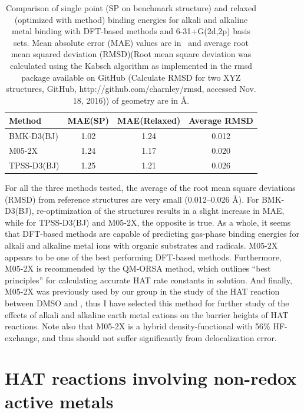 \begin{doublespace}
\begin{table}
  \caption[Comparison of single point and relaxed binding energies for alkali
  and alkaline metal binding with DFT-based methods.]{Comparison of single point
  (SP on benchmark structure) and relaxed (optimized with method) binding
  energies for alkali and alkaline metal binding with DFT-based methods and
  6-31+G(2d,2p) basis sets. Mean absolute error (MAE) values are in \kcalmol\
  and average root mean squared deviation (RMSD)(Root mean square deviation was
  calculated using the Kabsch algorithm\protect\cite{Kabsch1976} as implemented
  in the rmsd package available on GitHub (Calculate RMSD for two XYZ
  structures, GitHub, http://github.com/charnley/rmsd, accessed Nov. 18, 2016))
  of geometry are in \AA.}
  \label{tab:ccsd-metal-opt}
  \begin{tabular}{l c c c}
    Method & MAE(SP) & MAE(Relaxed) & Average RMSD \\
    \hline
    BMK-D3(BJ) & 1.02 & 1.24 & 0.012 \\
    M05-2X & 1.24 & 1.17 & 0.020 \\
    TPSS-D3(BJ) & 1.25 & 1.21 & 0.026 \\
  \end{tabular}
\end{table}

For all the three methods tested, the average of the root mean square deviations
(RMSD) from reference structures are very small (0.012--0.026 \AA). For
BMK-D3(BJ), re-optimization of the structures results in a slight increase in
MAE, while for TPSS-D3(BJ) and M05-2X, the opposite is true. As a whole, it
seems that DFT-based methods are capable of predicting gas-phase binding
energies for alkali and alkaline metal ions with organic substrates and
radicals. M05-2X appears to be one of the best performing DFT-based methods.
Furthermore, M05-2X is recommended by the QM-ORSA\cite{Galano2013} method, which
outlines ``best principles'' for calculating accurate HAT rate constants in
solution. And finally, M05-2X was previously used by our group in the study of
the HAT reaction between DMSO and \bno,\cite{vanSanten2016} thus I have selected
this method for further study of the effects of alkali and alkaline earth metal
cations on the barrier heights of HAT reactions. Note also that M05-2X is a
hybrid density-functional with 56\% HF-exchange, and thus should not suffer
significantly from delocalization error.

\section{HAT reactions involving non-redox active metals}

\end{doublespace}
